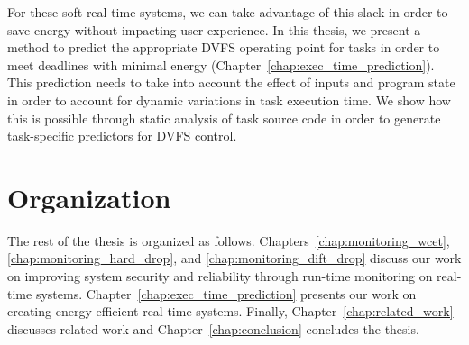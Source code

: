 For these soft real-time systems, we can take advantage of this slack in order
to save energy without impacting user experience. In this thesis, we present a
method to predict the appropriate DVFS operating point for tasks in order to
meet deadlines with minimal energy (Chapter~\ref{chap:exec_time_prediction}).
This prediction needs to take into account the effect of inputs and program
state in order to account for dynamic variations in task execution time. We
show how this is possible through static analysis of task source code in order
to generate task-specific predictors for DVFS control.

\section{Organization}
The rest of the thesis is organized as follows.
Chapters~\ref{chap:monitoring_wcet}, \ref{chap:monitoring_hard_drop}, and
\ref{chap:monitoring_dift_drop} discuss our work on improving system security
and reliability through run-time monitoring on real-time systems. 
Chapter~\ref{chap:exec_time_prediction} presents our work on creating
energy-efficient real-time systems. Finally, Chapter~\ref{chap:related_work}
discusses related work and Chapter~\ref{chap:conclusion} concludes the thesis.
